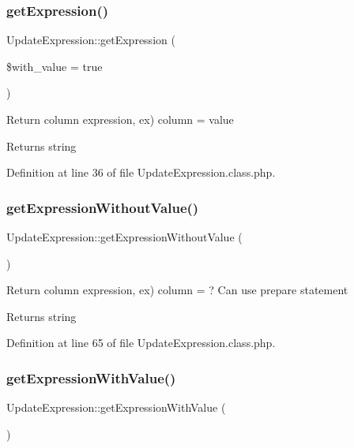 \subsubsection{\texorpdfstring{get\+Expression()}{getExpression()}}
{\footnotesize\ttfamily Update\+Expression\+::get\+Expression (\begin{DoxyParamCaption}\item[{}]{\$with\+\_\+value = {\ttfamily true} }\end{DoxyParamCaption})}

Return column expression, ex) column = value \begin{DoxyReturn}{Returns}
string 
\end{DoxyReturn}


Definition at line 36 of file Update\+Expression.\+class.\+php.

\hypertarget{classUpdateExpression_a91fc65199f195dd3c5ef96a6328b7554}{}\label{classUpdateExpression_a91fc65199f195dd3c5ef96a6328b7554} 
\subsubsection{\texorpdfstring{get\+Expression\+Without\+Value()}{getExpressionWithoutValue()}}
{\footnotesize\ttfamily Update\+Expression\+::get\+Expression\+Without\+Value (\begin{DoxyParamCaption}{ }\end{DoxyParamCaption})}

Return column expression, ex) column = ? Can use prepare statement \begin{DoxyReturn}{Returns}
string 
\end{DoxyReturn}


Definition at line 65 of file Update\+Expression.\+class.\+php.

\hypertarget{classUpdateExpression_abf5aa8ed9c023906f684c31ef735ecd6}{}\label{classUpdateExpression_abf5aa8ed9c023906f684c31ef735ecd6} 
\subsubsection{\texorpdfstring{get\+Expression\+With\+Value()}{getExpressionWithValue()}}
{\footnotesize\ttfamily Update\+Expression\+::get\+Expression\+With\+Value (\begin{DoxyParamCaption}{ }\end{DoxyParamCaption})}


